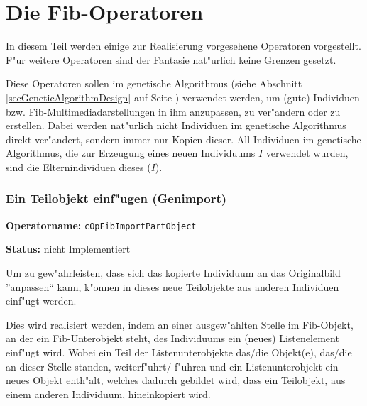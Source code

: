 %
%
%
%

\newpage
\part{Die Fib-Operatoren}
\label{partFibOperations}

In diesem Teil werden einige zur Realisierung vorgesehene Operatoren vorgestellt. F"ur weitere Operatoren sind der Fantasie nat"urlich keine Grenzen gesetzt.

Diese Operatoren sollen im genetische Algorithmus (siehe Abschnitt \ref{secGeneticAlgorithmDesign} auf Seite \pageref{secGeneticAlgorithmDesign} ) verwendet werden, um (gute) Individuen bzw. Fib-Multimediadarstellungen in ihm anzupassen, zu ver"andern oder zu erstellen. Dabei werden nat"urlich nicht Individuen im genetische Algorithmus direkt ver"andert, sondern immer nur Kopien dieser. All Individuen im genetische Algorithmus, die zur Erzeugung eines neuen Individuums $I$ verwendet wurden, sind die Elternindividuen dieses ($I$).



\section{Ein Teilobjekt einf"ugen (Genimport)}

\textbf{Operatorname:} \verb|cOpFibImportPartObject|

\bigskip\noindent
\textbf{Status:} nicht Implementiert

\bigskip\noindent
Um zu gew"ahrleisten, dass sich das kopierte Individuum an das Originalbild ''anpassen`` kann, k"onnen in dieses neue Teilobjekte aus anderen Individuen einf"ugt werden.

Dies wird realisiert werden, indem an einer ausgew"ahlten Stelle im Fib-Objekt, an der ein Fib-Unterobjekt steht, des Individuums ein (neues) Listenelement einf"ugt wird. Wobei ein Teil der Listenunterobjekte das/die Objekt(e), das/die an dieser Stelle standen, weiterf"uhrt/-f"uhren und ein Listenunterobjekt ein neues Objekt enth"alt, welches dadurch gebildet wird, dass ein Teilobjekt, aus einem anderen Individuum, hineinkopiert wird.

